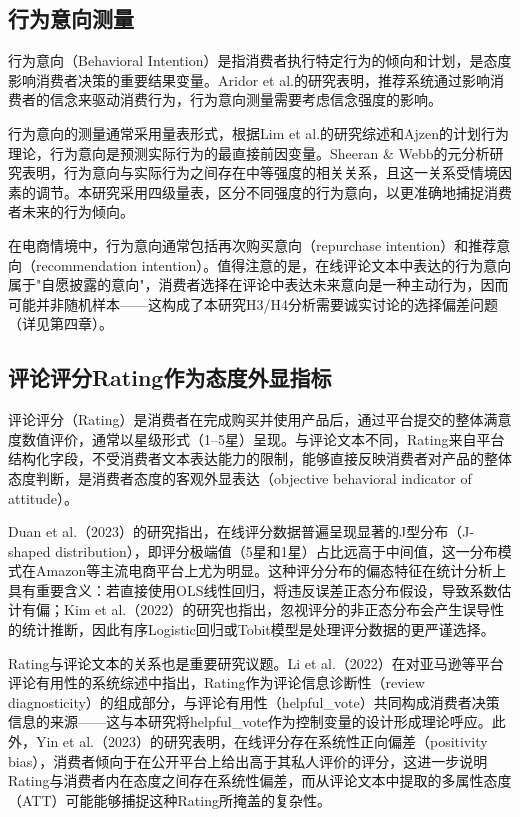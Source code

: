 \subsection{行为意向测量}

行为意向（Behavioral Intention）是指消费者执行特定行为的倾向和计划，是态度影响消费者决策的重要结果变量\cite{fishbein1975}。Aridor et al.\cite{aridor2022}的研究表明，推荐系统通过影响消费者的信念来驱动消费行为，行为意向测量需要考虑信念强度的影响。

行为意向的测量通常采用量表形式，根据Lim et al.\cite{lim2022}的研究综述和Ajzen\cite{ajzen1991}的计划行为理论，行为意向是预测实际行为的最直接前因变量。Sheeran \& Webb\cite{sheeran2022}的元分析研究表明，行为意向与实际行为之间存在中等强度的相关关系，且这一关系受情境因素的调节。本研究采用四级量表，区分不同强度的行为意向，以更准确地捕捉消费者未来的行为倾向。

在电商情境中，行为意向通常包括再次购买意向（repurchase intention）和推荐意向（recommendation intention）。值得注意的是，在线评论文本中表达的行为意向属于"自愿披露的意向"，消费者选择在评论中表达未来意向是一种主动行为，因而可能并非随机样本——这构成了本研究H3/H4分析需要诚实讨论的选择偏差问题（详见第四章）。

\subsection{评论评分Rating作为态度外显指标}

评论评分（Rating）是消费者在完成购买并使用产品后，通过平台提交的整体满意度数值评价，通常以星级形式（1--5星）呈现。与评论文本不同，Rating来自平台结构化字段，不受消费者文本表达能力的限制，能够直接反映消费者对产品的整体态度判断，是消费者态度的客观外显表达（objective behavioral indicator of attitude）。

Duan et al.（2023）\cite{duan2023}的研究指出，在线评分数据普遍呈现显著的J型分布（J-shaped distribution），即评分极端值（5星和1星）占比远高于中间值，这一分布模式在Amazon等主流电商平台上尤为明显。这种评分分布的偏态特征在统计分析上具有重要含义：若直接使用OLS线性回归，将违反误差正态分布假设，导致系数估计有偏；Kim et al.（2022）\cite{kim2022}的研究也指出，忽视评分的非正态分布会产生误导性的统计推断，因此有序Logistic回归或Tobit模型是处理评分数据的更严谨选择。

Rating与评论文本的关系也是重要研究议题。Li et al.（2022）\cite{li2022}在对亚马逊等平台评论有用性的系统综述中指出，Rating作为评论信息诊断性（review diagnosticity）的组成部分，与评论有用性（helpful\_vote）共同构成消费者决策信息的来源——这与本研究将helpful\_vote作为控制变量的设计形成理论呼应。此外，Yin et al.（2023）\cite{yin2023}的研究表明，在线评分存在系统性正向偏差（positivity bias），消费者倾向于在公开平台上给出高于其私人评价的评分，这进一步说明Rating与消费者内在态度之间存在系统性偏差，而从评论文本中提取的多属性态度（ATT）可能能够捕捉这种Rating所掩盖的复杂性。

